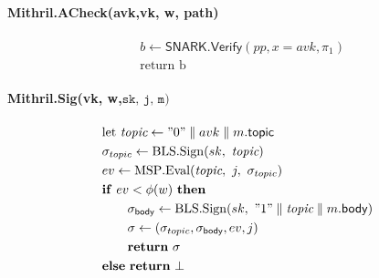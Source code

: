\documentclass{article}
\begin{document}
\paragraph{Mithril.ACheck(avk,\textbf{vk}, \textbf{w}, \textbf{path})}
\begin{align*}
&b \leftarrow \mathsf{SNARK.Verify}(pp, x = avk, \pi_1)\\
&\text{return b} 
\end{align*}




\paragraph{Mithril.Sig(vk, w,$\texttt{sk, j, m})$}
\begin{align*}
&\text{let } \textit{topic} \leftarrow "0" \parallel avk \parallel m.\mathsf{topic}\\
&\sigma_{topic} \leftarrow \mathrm{BLS.Sign}(sk,\ \textit{topic})\\
&ev \leftarrow \mathrm{MSP.Eval}(\textit{topic},\ j,\ \sigma_{topic})\\
&\mathbf{if}\ ev < \phi(w)\ \mathbf{then}\\
&\qquad \sigma_{\mathsf{body}} \leftarrow \mathrm{BLS.Sign}(sk,\ "1" \parallel \textit{topic} \parallel m.\mathsf{body})\\
&\qquad \sigma \leftarrow (\sigma_{topic},\sigma_{\mathsf{body}}, ev, j)\\
&\qquad \textbf{return}\ \sigma \\
&\mathbf{else}\ \textbf{return}\ \bot
\end{align*}
\end{document}
